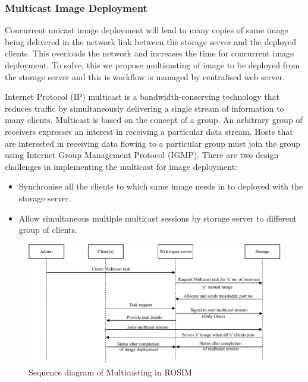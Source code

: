 \documentclass[a4paper,12pt]{article}
\begin{document}
\subsubsection{ Multicast Image Deployment}
Concurrent unicast image deployment will lead to many copies of same image being delivered in the network link between the storage server and the deployed clients. This overloads the network and increases the time for concurrent image deployment. To solve, this we propose multicasting of image to be deployed from the storage server and this is workflow is managed by centralised web server.

Internet Protocol (IP) multicast is a bandwidth-conserving technology that reduces traffic by simultaneously delivering a single stream of information to many clients. Multicast is based on the concept of a group. An arbitrary group of receivers expresses an interest in receiving a particular data stream. Hosts that are interested in receiving data flowing to a particular group must join the group using Internet Group Management Protocol (IGMP). There are two design challenges in implementing the multicast for image deployment:
 \begin{itemize}
     \item Synchronise all the clients to which same image needs in  to deployed with the storage server.
     \item Allow simultaneous multiple multicast sessions by storage server to different group of clients.
 \end{itemize}

\begin{figure}[h!]
    \centering
    \includegraphics[width=\linewidth]{Multicasting.pdf}
    \caption{Sequence diagram of Multicasting in ROSIM}
    \label{Multicast_seq}
\end{figure}
\end{document}
